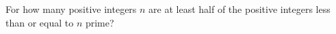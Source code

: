 For how many positive integers $n$ are at least half of the positive integers less than or equal to $n$ prime?

